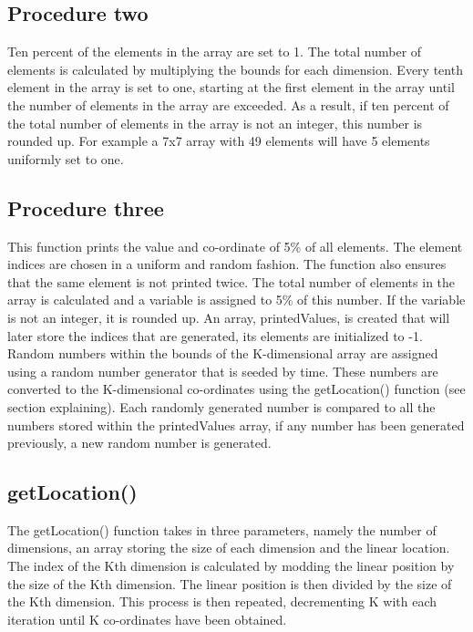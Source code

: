\documentclass[10pt,onecolumn]{article}
\begin{document}
\subsection*{Procedure two}
Ten percent of the elements in the array are set to 1. The total number of elements is calculated by multiplying the bounds for each dimension. Every tenth element in the array is set to one, starting at the first element in the array until the number of elements in the array are exceeded. As a result, if ten percent of the total number of elements in the array is not an integer, this number is rounded up. For example a 7x7 array with 49 elements will have 5 elements uniformly set to one.

\subsection*{Procedure three}
This function prints the value and co-ordinate of 5\% of all elements. The element indices are chosen in a uniform and random fashion. The function also ensures that the same element is not printed twice. The total number of elements in the array is calculated and a variable is assigned to 5\% of this number. If the variable is not an integer, it is rounded up. An array, printedValues, is created that will later store the indices that are generated, its elements are initialized to -1. Random numbers within the bounds of the K-dimensional array are assigned using a random number generator that is seeded by time. These numbers are converted to the K-dimensional co-ordinates using the getLocation() function (see section explaining). Each randomly generated number is compared to all the numbers stored within the printedValues array, if any number has been generated previously, a new random number is generated. \\

\subsection*{getLocation()}
The getLocation() function takes in three parameters, namely the number of dimensions, an array storing the size of each dimension and the linear location. The index of the Kth dimension is calculated by modding the linear position by the size of the Kth dimension. The linear position is then divided by the size of the Kth dimension. This process is then repeated, decrementing K with each iteration until K co-ordinates have been obtained. \\
\end{document}
